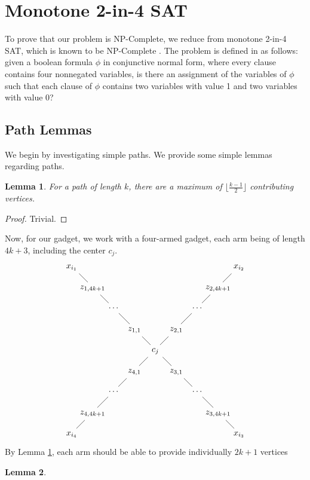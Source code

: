 \documentclass[11pt]{article}
\theoremstyle{plain}
\newtheorem{lemma}{Lemma}
\theoremstyle{definition}
\theoremstyle{remark}
\begin{document}
\section{Monotone 2-in-4 SAT}

To prove that our problem is NP-Complete, we reduce from monotone 2-in-4 SAT, which is known to be NP-Complete \citep{KaraKratochvilWood2007}. The problem is defined in \citep{scheffler2022distance} as follows: given a boolean formula $\phi$ in conjunctive normal form, where every clause contains four nonnegated variables, is there an assignment of the variables of $\phi$ such that each clause of $\phi$ contains two variables with value 1 and two variables with value 0?

\subsection{Path Lemmas}

We begin by investigating simple paths. We provide some simple lemmas regarding paths.
\begin{lemma} \label{lem:pathlength}
    For a path of length $k$, there are a maximum of $\lfloor\frac{k-1}{2}\rfloor$ contributing vertices. 
\end{lemma}
\begin{proof}
    Trivial.
\end{proof}
Now, for our gadget, we work with a four-armed gadget, each arm being of length $4k+3$, including the center $c_j$. 
\[
\begin{tikzcd}[
  row sep={2.5em,between origins},
  column sep={2.5em,between origins}
]
x_{i_1} \arrow[dr, dash]
&&&&&&&& x_{i_2} \arrow[dl, dash] \\
& z_{1,4k+1} \arrow[dr, dash]
&&&&&& z_{2,4k+1} \arrow[dl, dash] \\
&& \cdots \arrow[dr, dash]
&&&& \cdots \arrow[dl, dash] \\
&&& z_{1,1} \arrow[dr, dash]
&& z_{2,1} \arrow[dl, dash] \\
&&&& c_j \arrow[dl, dash] \arrow[dr, dash] \\
&&& z_{4,1} \arrow[dl, dash]
&& z_{3,1} \arrow[dr, dash] \\
&& \cdots \arrow[dl, dash]
&&&& \cdots \arrow[dr, dash] \\
& z_{4,4k+1} \arrow[dl, dash]
&&&&&& z_{3,4k+1} \arrow[dr, dash] \\
x_{i_4} &&&&&&&& x_{i_3}
\end{tikzcd}
\]
By Lemma \ref{lem:pathlength}, each arm should be able to provide individually $2k+1$ vertices

\begin{lemma}
    
\end{lemma}



\end{document}
